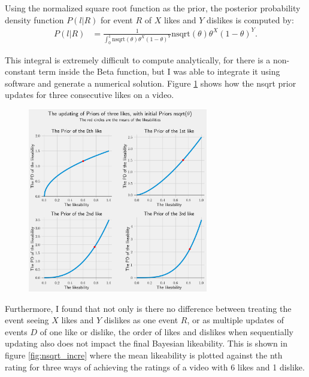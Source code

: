 \documentclass[a4paper,11pt]{article}
\begin{document}
Using the normalized square root function as the prior, the posterior probability density function $P(l|R)$ for event $R$ of $X$ likes and $Y$ dislikes is computed by:
\begin{align*}
    P(l|R) &= \frac{1}{\int_0^1 \text{nsqrt}(\theta) \theta^X (1-\theta)^Y } \text{nsqrt}(\theta) \theta^X (1-\theta)^Y.
\end{align*}

This integral is extremely difficult to compute analytically, for there is a non-constant term inside the Beta function, but I was able to integrate it using software and generate a numerical solution. Figure \ref{fig:up_nsqrt} shows how the nsqrt prior updates for three consecutive likes on a video.

\begin{figure}[H]
    \centering
    \includegraphics[width=0.7\textwidth]{assets/nsqrt_updating_priors.png}
    \caption{}
    \label{fig:up_nsqrt}
\end{figure}


Furthermore, I found that not only is there no difference between treating the event seeing $X$ likes and $Y$ dislikes as one event $R$, or as multiple updates of events $D$ of one like or dislike, the order of likes and dislikes when sequentially updating also does not impact the final Bayesian likeability. This is shown in figure \ref{fig:nsqrt_incre} where the mean likeability is plotted against the nth rating for three ways of achieving the ratings of a video with 6 likes and 1 dislike.
\end{document}
